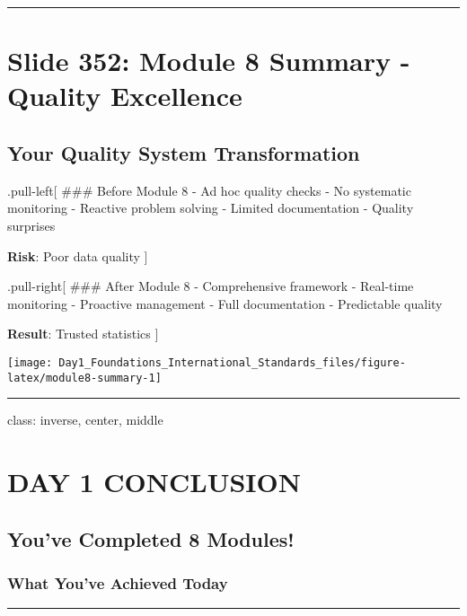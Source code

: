 \documentclass[
]{article}
\begin{document}
\begin{center}\rule{0.5\linewidth}{0.5pt}\end{center}

\section{Slide 352: Module 8 Summary - Quality
Excellence}\label{slide-352-module-8-summary---quality-excellence}

\subsection{Your Quality System
Transformation}\label{your-quality-system-transformation}

.pull-left{[} \#\#\# Before Module 8 - Ad hoc quality checks - No
systematic monitoring - Reactive problem solving - Limited documentation
- Quality surprises

\textbf{Risk}: Poor data quality {]}

.pull-right{[} \#\#\# After Module 8 - Comprehensive framework -
Real-time monitoring - Proactive management - Full documentation -
Predictable quality

\textbf{Result}: Trusted statistics {]}

\texttt{[image: Day1\_Foundations\_International\_Standards\_files/figure-latex/module8-summary-1]}

\begin{center}\rule{0.5\linewidth}{0.5pt}\end{center}

class: inverse, center, middle

\section{DAY 1 CONCLUSION}\label{day-1-conclusion}

\subsection{You've Completed 8
Modules!}\label{youve-completed-8-modules}

\subsubsection{What You've Achieved
Today}\label{what-youve-achieved-today}

\begin{center}\rule{0.5\linewidth}{0.5pt}\end{center}
\end{document}
